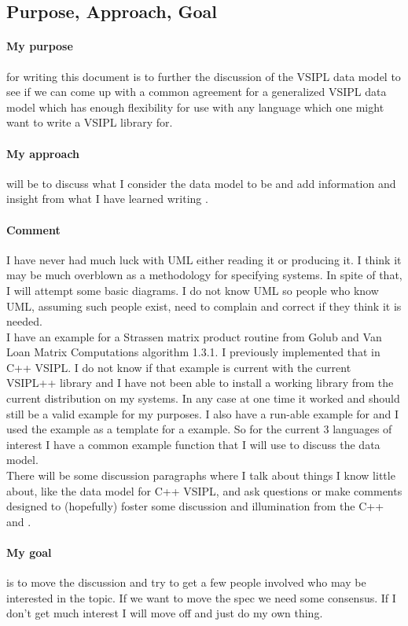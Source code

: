 \subsection{Purpose, Approach, Goal}
\paragraph{My purpose} for writing this document is to further the discussion of the VSIPL data model to see if we can come up with a common agreement for a generalized VSIPL data model which has enough flexibility for use with any language which one might want to write a VSIPL library for.
\paragraph{My approach} will be to discuss what I consider the \cvl{} data model to be and add information and insight from what I have learned writing \pyjv{}.  
\paragraph{Comment}
I have never had much luck with UML either reading it or producing it. I think it may be much overblown as a methodology for specifying systems.  In spite of that, I will attempt some basic diagrams. I do not know UML so people who know UML, assuming such people exist, need to complain and correct if they think it is needed.
\\[6pt]
I have an example for a Strassen matrix product routine from Golub and Van Loan Matrix Computations algorithm 1.3.1.  I previously implemented that in C++ VSIPL.  I do not know if that example is current with the current VSIPL++ library and I have not been able to install a working library from the current distribution on my systems.  In any case at one time it worked and should still be a valid example for my purposes.  I also have a run-able example for \cvl{} and I used the \cvl{} example as a template for a \pyjv{} example.  So for the current 3 languages of interest I have a common example function that I will use to discuss the data model.
\\[6pt]
There will be some discussion paragraphs where I talk about things I know little about, like the data model for C++ VSIPL, and ask questions or make comments designed to (hopefully) foster some discussion and illumination from the C++  and .
  
\paragraph{My goal} is to move the discussion and try to get a few people involved who may be interested in the topic.  If we want to move the spec we need some consensus. If I don't get much interest I will move off and just do my own thing.
